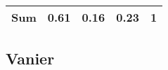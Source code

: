 \documentclass[]{book}
\theoremstyle{definition}
\theoremstyle{definition}
\theoremstyle{remark}
\begin{document}
\begin{longtable}[]{@{}ccccc@{}}
\begin{minipage}[t]{0.12\columnwidth}
\textbf{Sum}\strut
\end{minipage} & \begin{minipage}[t]{0.06\columnwidth}\centering\strut
0.61\strut
\end{minipage} & \begin{minipage}[t]{0.06\columnwidth}\centering\strut
0.16\strut
\end{minipage} & \begin{minipage}[t]{0.06\columnwidth}\centering\strut
0.23\strut
\end{minipage} & \begin{minipage}[t]{0.06\columnwidth}\centering\strut
1\strut
\end{minipage}\tabularnewline
\bottomrule
\end{longtable}

\subsection{Vanier}\label{vanier}
\end{document}

